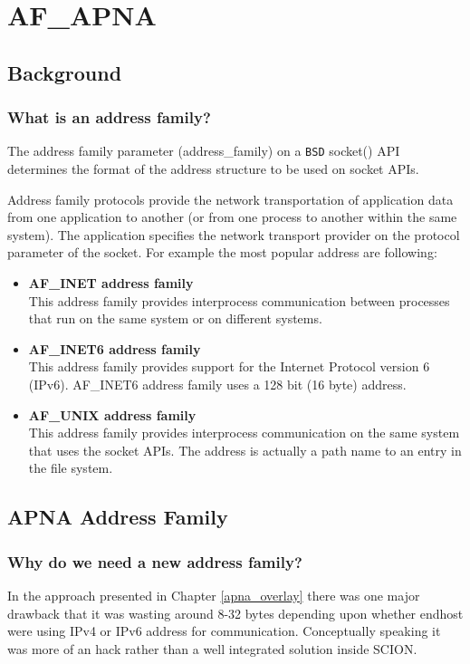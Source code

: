 
\chapter{AF\_APNA} %

\label{address_family}

\section{Background}
\subsection{What is an address family?}
The address family parameter (address\_family) on a \texttt{BSD} socket() API determines the format of the address structure to be used on socket APIs.

Address family protocols provide the network transportation of application data from one application to another (or from one process to another within the same system). The application specifies the network transport provider on the protocol parameter of the socket. For example the most popular address are following:
\begin{itemize}
    \item \textbf{AF\_INET address family} \\
    This address family provides interprocess communication between processes that run on the same system or on different systems.
    \item \textbf{AF\_INET6 address family} \\
    This address family provides support for the Internet Protocol version 6 (IPv6). AF\_INET6 address family uses a 128 bit (16 byte) address.
    \item \textbf{AF\_UNIX address family} \\
    This address family provides interprocess communication on the same system that uses the socket APIs. The address is actually a path name to an entry in the file system.
\end{itemize}

\section{APNA Address Family}
\subsection{Why do we need a new address family?}
In the approach presented in Chapter \ref{apna_overlay} there was one major drawback that it was wasting around 8-32 bytes depending upon whether endhost were using IPv4 or IPv6 address for communication. Conceptually speaking it was more of an hack rather than a well integrated solution inside SCION. 

